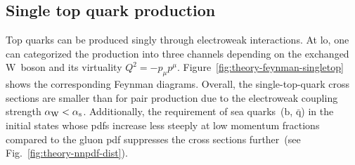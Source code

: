 \subsection{Single top quark production}

Top quarks can be produced singly through electroweak interactions. At \gls{lo}, one can categorized the production into three channels depending on the exchanged $\mathrm{W}$~boson and its virtuality $Q^{2}=-p_{\mu}p^{\mu}$. Figure~\ref{fig:theory-feynman-singletop} shows the corresponding Feynman diagrams. Overall, the single-top-quark cross sections are smaller than for pair production due to the electroweak coupling strength ${\alpha_\mathrm{W}}<{\alpha_\mathrm{s}}$. Additionally, the requirement of sea quarks~($\mathrm{b}$, $\bar{\mathrm{q}}$) in the initial states whose \glspl{pdf} increase less steeply at low momentum fractions compared to the gluon \gls{pdf} suppresses the cross sections further~(see Fig.~\ref{fig:theory-nnpdf-dist}).

